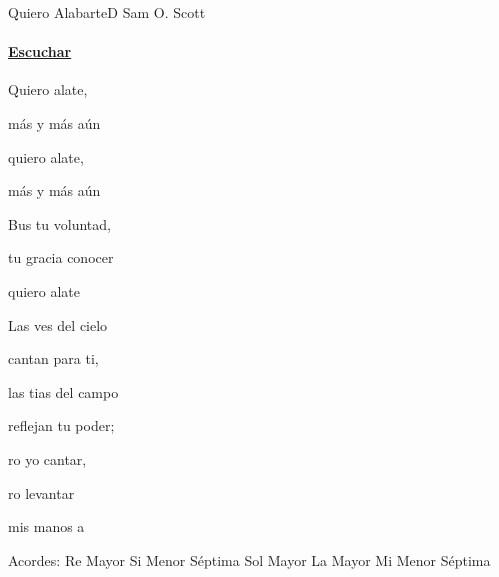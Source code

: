 \documentclass[12pt, spanish]{book}
\begin{document}
    \begin{song}{Quiero Alabarte}{D}
    {} %
    {Sam O. Scott}
    {} %
    {} %
        \ifChordBk
        \paragraph{\mbox{}\hfill\protect\href{https://open.spotify.com/intl-es/track/0bTnnEglEgamzfRoKd7LRh}{Escuchar}\mbox{}\hfill}
        \fi

        \begin{SBOpGroup}
            Quiero alate,

            más y más aún

            quiero alate,

            más y más aún
        \end{SBOpGroup}
        \vskip 20pt
        \begin{SBOpGroup}
            Bus tu voluntad,

            tu gracia conocer

            quiero alate
        \end{SBOpGroup}
        \vskip 20pt
        \begin{SBOpGroup}
            Las ves del cielo

            cantan para ti,

            las tias del campo

            reflejan tu poder;

            ro yo cantar,

            ro levantar

            mis manos a 
        \end{SBOpGroup}

        \ifChordBk
        \begin{SBOpGroup}
            Acordes:
            \upchord{\D}\qquad Re Mayor \hfill
            \upchord{\Bmseven}\qquad Si Menor S\'eptima \hfill\null\break
            \upchord{\G}\qquad Sol Mayor \hfill
            \upchord{\A}\qquad La Mayor \hfill
            \upchord{\Emseven}Mi Menor S\'eptima \hfill\null\break
        \end{SBOpGroup}
        \fi
    \end{song}
\end{document}
